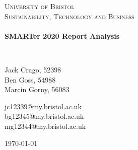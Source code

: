 
\begin{titlepage}
\begin{center}


\textsc{\Huge University of Bristol}\\[1.5cm]


\textsc{\Large Sustainability, Technology and Business}\\[0.5cm]

\HRule \\[0.4cm]
{ \huge \bfseries SMARTer 2020 Report Analysis \\[0.4cm] }

\HRule \\[1.5cm]

\begin{minipage}{0.4\textwidth}
\begin{flushleft} \large
Jack Crago, 52398\\
Ben Goss, 54988\\
Marcin Gorny, 56083\\
\end{flushleft}
\end{minipage}
\begin{minipage}{0.4\textwidth}
\begin{flushright} \large
jc12339@my.bristol.ac.uk\\
bg12345@my.bristol.ac.uk\\
mg12344@my.bristol.ac.uk
\end{flushright}
\end{minipage}
\end{center}

\vspace{1cm}
\center
\begin{minipage}{0.9\textwidth}

\end{minipage}



\vfill

\begin{center}
{\large \today}

\end{center}
\end{titlepage}